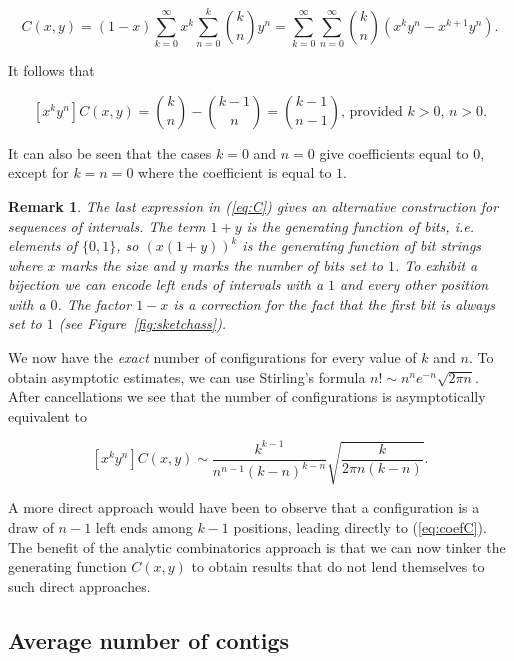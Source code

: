 \documentclass{article}
\newtheorem{remark}{Remark}
\begin{document}
\begin{equation*}
C(x,y) = (1-x)\sum_{k=0}^\infty x^k\sum_{n=0}^k {k \choose n} y^n
= \sum_{k=0}^\infty\sum_{n=0}^\infty{k \choose n} (x^ky^n - x^{k+1}y^n).
\end{equation*}

It follows that

\begin{equation}
\label{eq:coefC}
[x^ky^n] C(x,y) =
{k \choose n} - {k-1 \choose n} = {k-1 \choose n-1}
\text{, provided $k > 0$, $n > 0$}.
\end{equation}

It can also be seen that the cases $k = 0$ and $n = 0$ give coefficients
equal to $0$, except for $k = n = 0$ where the coefficient is equal to
$1$.

\begin{remark}
The last expression in (\ref{eq:C}) gives an alternative construction for
sequences of intervals. The term $1+y$ is the generating function of bits,
\textit{i.e.} elements of $\{0,1\}$, so $(x(1+y))^k$ is the generating
function of bit strings where $x$ marks the size and $y$ marks the number
of bits set to $1$. To exhibit a bijection we can encode left ends of
intervals with a $1$ and every other position with a $0$. The factor $1-x$
is a correction for the fact that the first bit is always set to $1$ (see
Figure~\ref{fig:sketchass}).
\end{remark}

We now have the \emph{exact} number of configurations for every value of
$k$ and $n$. To obtain asymptotic estimates, we can use Stirling's formula
$n! \sim n^ne^{-n}\sqrt{2\pi n}$. After cancellations we see that the
number of configurations is asymptotically equivalent to

\begin{equation}
\label{eq:assBC}
[x^ky^n]C(x,y) \sim \frac{k^{k-1}}{n^{n-1}(k-n)^{k-n}}
\sqrt{\frac{k}{2\pi n(k-n)}}.
\end{equation}

A more direct approach would have been to observe that a configuration is
a draw of $n-1$ left ends among $k-1$ positions, leading directly to
(\ref{eq:coefC}). The benefit of the analytic combinatorics approach is
that we can now tinker the generating function $C(x,y)$ to obtain results
that do not lend themselves to such direct approaches.




\subsection{Average number of contigs}
\label{subsec:av}
\end{document}
